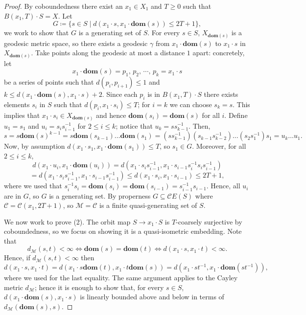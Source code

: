 \documentclass[svgnames]{amsart}
\theoremstyle{plain}
\theoremstyle{definition}
\newcommand{\dom}[1]{\mathbf{dom}\left(#1\right)}
\begin{document}
\begin{proof}
	By coboundedness there exist an 
    $x_1 \in X_1$ and $T\ge 0$ such that $B(x_1,T) \cdot S = X$. Let $$G \coloneq \{ s \in S \mid d(x_1 \cdot s, x_1\cdot \dom{s})\le 2T+1\},$$ we work to show that $G$ is a generating set of $S$. For every $s \in S$, $X_{\dom{s}}$ is a geodesic metric space, so there exists a geodesic
	$\gamma$ from $x_1 \cdot \dom{s}$ to $x_1 \cdot s$ in  $X_{\dom{s}}$.
    Take points along the geodesic at most a distance $1$ apart: concretely,
    let $$x_1 \cdot \dom{s} = p_1, \,p_2,\, \cdots,\, p_k = x_1 \cdot s$$
    be a series of points
    such that $d(p_i,p_{i+1}) \leq 1$ and $k \leq d(x_1 \cdot \dom{s}, x_1 \cdot s) + 2$.
    Since each $p_{i}$ is in $B(x_1,T) \cdot S$ there exists elements $s_{i}$ in $S$ 
	such that $d(p_{i}, x_1 \cdot s_{i}) \leq T$; for $i=k$ we can choose $s_k=s$. This implies that $x_1 \cdot s_i \in X_{\dom{s}}$ and hence
	$\dom{s_{i}} = \dom{s}$ for all $i$.
	Define $u_1 = s_1$ and $u_{i} = s_{i} s_{i-1}^{-1}$ for $2 \leq i \leq k$; notice that $u_k=ss_{k-1}^{-1}$. Then,
	\[
		s = s\dom{s}^{k-1}=s\dom{s_{k-1}}\ldots\dom{s_1}=(s s_{k-1}^{-1})(s_{k-1}s_{k-2}^{-1})\ldots (s_2s_1^{-1})s_1 = u_{k} \ldots u_{1}.
	\]
    Now, by assumption
    $d(x_1 \cdot s_1, x_1 \cdot \dom{s_1}) \leq T$, so $s_1\in G$. Moreover, for all $2 \leq i \leq k$,
	\[d(x_1 \cdot u_i, x_1 \cdot \dom{u_i}) = d(x_1 \cdot s_is_{i-1}^{-1}, x_1 \cdot s_{i-1}s_i^{-1}s_is_{i-1}^{-1})\]\[ =d(x_1 \cdot s_is_{i-1}^{-1}, x_1 \cdot s_{i-1}s_{i-1}^{-1}) \leq d(x_1\cdot  s_{i}, x_1 \cdot s_{i-1}) \leq 2T + 1,\]
	where we used that $s_i^{-1}s_i=\dom{s_i}=\dom{s_{i-1}}=s_{i-1}^{-1}s_{i-1}$. 
    Hence,  all $u_i$ are in $G$, so $G$ is a generating set.
    By properness $G \subseteq \mathcal{C}E(S)$ where $\mathcal{C}= \mathcal{C}(x_1, 2T+1)$, so
    $\mathcal{M} = \mathcal{C}$ is a finite quasi-generating set of $S$.

    We now work to prove (2). The orbit map $S\to x_1\cdot S$ is $T$-coarsely surjective by coboundedness, so we focus on showing it is a quasi-isometric embedding. Note that $$d_{\mathcal{M}}(s,t) < \infty \iff \dom{s}=\dom{t} \iff
    d(x_1 \cdot s, x_1 \cdot t) < \infty.$$ Hence, if $d_{\mathcal{M}}(s,t)<\infty$ then 
    \[d(x_1 \cdot s, x_1 \cdot t) =d(x_1 \cdot s\dom{t}, x_1 \cdot t\dom{s})= d(x_1 \cdot st^{-1}, x_1 \cdot \dom{st^{-1}}),\]
    where we used  for the last equality. The same argument applies to the Cayley metric $d_\mathcal{M}$; hence it is enough to show that, for every $s\in S$, $d(x_1\cdot \dom{s}, x_1\cdot s)$ is linearly bounded above and below in terms of $d_{\mathcal{M}}(\dom{s}, s)$. 
    

\end{proof}
\end{document}
